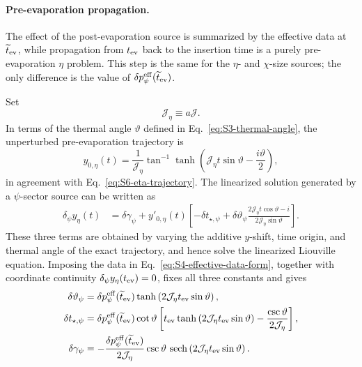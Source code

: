 \documentclass[11pt,a4paper]{article}
\begin{document}
\paragraph*{Pre-evaporation propagation.}

The effect of the post-evaporation source is summarized by the effective data
at \(\widetilde t_{\rm ev}\), while propagation from \(t_{\rm ev}\) back to
the insertion time is a purely pre-evaporation \(\eta\) problem. This step is
the same for the \(\eta\)- and \(\chi\)-size sources; the only difference is
the value of \(\delta p_\psi^{\rm eff}(\widetilde t_{\rm ev})\).

Set
\begin{equation}
  \mathcal J_\eta
  \equiv
  a\mathcal J .
\label{eq:S4-Jeta}
\end{equation}
In terms of the thermal angle \(\vartheta\) defined in
Eq.~\eqref{eq:S3-thermal-angle}, the unperturbed pre-evaporation trajectory is
\begin{equation}
  y_{0,\eta}(t)
  =
  \frac{1}{\mathcal J_\eta}
  \tan^{-1}
  \tanh\left(
  \mathcal J_\eta t\sin\vartheta
  -
  \frac{i\vartheta}{2}
  \right),
\label{eq:S4-unperturbed-eta-trajectory}
\end{equation}
in agreement with Eq.~\eqref{eq:S6-eta-trajectory}. The linearized solution
generated by a \(\psi\)-sector source can be written as
\begin{equation}
\begin{aligned}
  \delta_\psi y_\eta(t)
  &=
  \delta\gamma_\psi
  +
  y'_{0,\eta}(t)
  \left[
  -\delta t_{\star,\psi}
  +
  \delta\vartheta_\psi
  \frac{
  2\mathcal J_\eta t\cos\vartheta-i
  }{
  2\mathcal J_\eta\sin\vartheta
  }
  \right].
\end{aligned}
\label{eq:S4-linearized-eta-trajectory}
\end{equation}
These three terms are obtained by varying the additive \(y\)-shift, time
origin, and thermal angle of the exact trajectory, and hence solve the
linearized Liouville equation. Imposing the data in
Eq.~\eqref{eq:S4-effective-data-form}, together with coordinate continuity
\(\delta_\psi y_\eta(t_{\rm ev})=0\), fixes all three constants and gives
\begin{equation}
\begin{aligned}
  \delta\vartheta_\psi
  &=
  \delta p_\psi^{\rm eff}(\widetilde t_{\rm ev})
  \tanh\left(
  2\mathcal J_\eta t_{\rm ev}\sin\vartheta
  \right),
  \\
  \delta t_{\star,\psi}
  &=
  \delta p_\psi^{\rm eff}(\widetilde t_{\rm ev})
  \cot\vartheta
  \left[
  t_{\rm ev}
  \tanh\left(
  2\mathcal J_\eta t_{\rm ev}\sin\vartheta
  \right)
  -
  \frac{\csc\vartheta}{2\mathcal J_\eta}
  \right],
  \\
  \delta\gamma_\psi
  &=
  -\frac{
  \delta p_\psi^{\rm eff}(\widetilde t_{\rm ev})
  }{
  2\mathcal J_\eta
  }
  \csc\vartheta\,
  \operatorname{sech}\left(
  2\mathcal J_\eta t_{\rm ev}\sin\vartheta
  \right).
\end{aligned}
\label{eq:S4-linearized-eta-parameters}
\end{equation}
\end{document}
